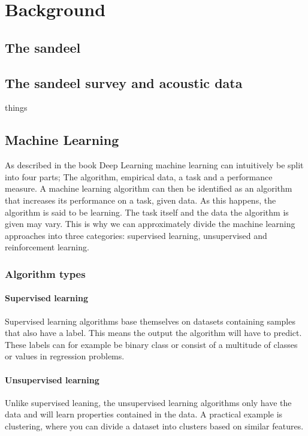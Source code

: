\chapter{Background}

\section{The sandeel}
    

\section{The sandeel survey and acoustic data} \label{acoustic_data}
    things


\section{Machine Learning} \label{Machine Learning}
    As described in the book Deep Learning\cite{Goodfellow-et-al-2016_ML} machine learning can intuitively be split into four parts; The algorithm, empirical data, a task and a performance measure. A machine learning algorithm can then be identified as an algorithm that increases its performance on a task, given data. As this happens, the algorithm is said to be learning. The task itself and the data the algorithm is given may vary. This is why we can approximately divide the machine learning approaches into three categories\cite{Goodfellow-et-al-2016_E}: supervised learning, unsupervised and reinforcement learning. 
    
    \subsection{Algorithm types} \label{Algorithm types}
        \subsubsection{Supervised learning}
            Supervised learning \cite{Goodfellow-et-al-2016_E} algorithms base themselves on datasets containing samples that also have a label. This means the output the algorithm will have to predict. These labels can for example be binary class or consist of a multitude of classes or values in regression problems.
            
        \subsubsection{Unsupervised learning}
            Unlike supervised leaning, the unsupervised learning \cite{Goodfellow-et-al-2016_E} algorithms only have the data and will learn properties contained in the data. A practical example is clustering, where you can divide a dataset into clusters based on similar features. 
                
